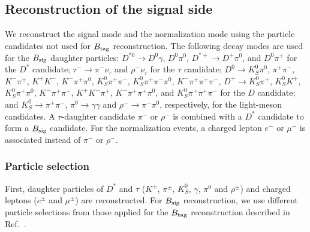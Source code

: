 \documentclass[aps,prd,twocolumn,superscriptaddress,showpacs,preprintnumbers,amsmath,amssymb]{revtex4-1}
\begin{document}
\subsection{Reconstruction of the signal side}\label{sec:event-reconstruction}

We reconstruct the signal mode and the normalization mode using the particle candidates not used for $B_{\rm tag}$ reconstruction. The following decay modes are used for the $B_{\rm sig}$ daughter particles: $D^{*0} \rightarrow D^0 \gamma$, $D^0 \pi^0$, $D^{*+} \rightarrow D^+ \pi^0$, and $D^0 \pi^+$ for the $D^*$ candidate; $\tau^- \rightarrow \pi^- \nu_\tau$ and $\rho^- \nu_\tau$ for the $\tau$ candidate; $D^0 \rightarrow K_S^0 \pi^0$, $\pi^+ \pi^-$, $K^- \pi^+$, $K^+ K^-$, $K^- \pi^+ \pi^0$, $K_S^0 \pi^+ \pi^-$, $K_S^0 \pi^+ \pi^- \pi^0$, $K^- \pi^+ \pi^+ \pi^-$, $D^+ \rightarrow K_S^0 \pi^+$, $K_S^0 K^+$, $K_S^0 \pi^+ \pi^0$, $K^- \pi^+ \pi^+$, $K^+ K^- \pi^+$, $K^- \pi^+ \pi^+ \pi^0$, and $K_S^0 \pi^+ \pi^+ \pi^-$ for the $D$ candidate; and $K_S^0 \rightarrow \pi^+ \pi^-$, $\pi^0 \rightarrow \gamma \gamma$ and $\rho^- \rightarrow \pi^- \pi^0$, respectively, for the light-meson candidates. A $\tau$-daughter candidate $\pi^-$ or $\rho^-$ is combined with a $D^*$ candidate to form a $B_{\rm sig}$ candidate. For the normalization events, a charged lepton $e^-$ or $\mu^-$ is associated instead of $\pi^-$ or $\rho^-$.

\subsubsection{Particle selection}

First, daughter particles of $D^*$ and $\tau$ ($K^\pm$, $\pi^\pm$, $K_S^0$, $\gamma$, $\pi^0$ and $\rho^\pm$) and charged leptons ($e^\pm$ and $\mu^\pm$) are reconstructed. For $B_{\rm sig}$ reconstruction, we use different particle selections from those applied for the $B_{\rm tag}$ reconstruction described in Ref.~\cite{cite:Full-recon:2011}. 
\end{document}
